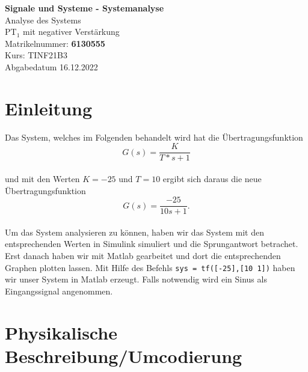 \documentclass[
  ngerman
  ,12pt
  ,pdftex
]{article}
\begin{document}
\begin{titlepage}
  \begin{center}
      {\Huge \textbf{Signale und Systeme - Systemanalyse}}\\[1.5cm]
      {\Large Analyse des Systems}\\[1cm]
      {\Huge PT$_{1}$ mit negativer Verstärkung}\\[7cm]
      {\large Matrikelnummer: \textbf{6130555}}\\[0.5cm]
      {\large Kurs: TINF21B3}\\[0.5cm]
      {\large Abgabedatum 16.12.2022}
      \vfill
  \end{center}
\end{titlepage}
\newpage
\tableofcontents
\newpage

\section{Einleitung}
Das System, welches im Folgenden behandelt wird hat die Übertragungsfunktion
\begin{equation*}
  G(s)=\frac{K}{T*s+1}
\end{equation*}\\
und mit den Werten $K=-25$ und $T=10$ ergibt sich daraus die neue Übertragungsfunktion
\begin{equation*}
  G(s)=\frac{-25}{10s+1} .
\end{equation*}\\
Um das System analysieren zu können, haben wir das System mit den entsprechenden Werten in Simulink simuliert und die Sprungantwort betrachet.\\
Erst danach haben wir mit Matlab gearbeitet und dort die entsprechenden Graphen plotten lassen. Mit Hilfe des Befehls \texttt{sys = tf([-25],[10 1])} haben wir unser System in Matlab erzeugt. Falls notwendig wird ein Sinus als Eingangssignal angenommen. %

\section{Physikalische Beschreibung/Umcodierung}

\end{document}
